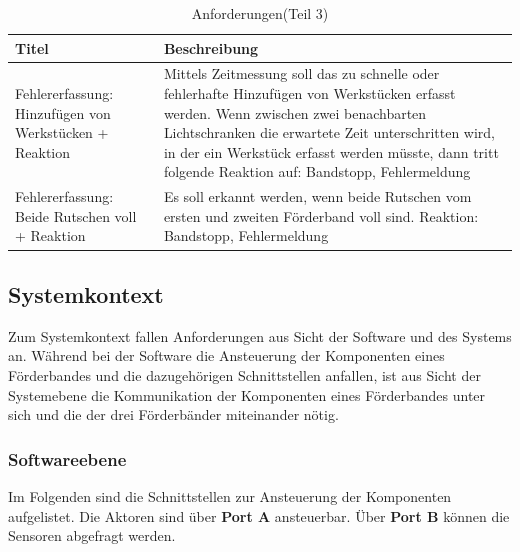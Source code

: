 \documentclass[a4paper, 11pt]{article}
\begin{document}
\newpage

\begin{table}[H]
\centering
    \begin{tabularx}{\textwidth}{|X|X|}
    \hline
    \textbf{Titel}&\textbf{Beschreibung}\\
    \hline
    Fehlererfassung: Hinzufügen von Werkstücken + Reaktion&Mittels Zeitmessung soll das zu schnelle oder fehlerhafte Hinzufügen von Werkstücken erfasst werden. Wenn zwischen zwei benachbarten Lichtschranken die erwartete Zeit unterschritten wird, in der ein Werkstück erfasst werden müsste, dann tritt folgende Reaktion auf: Bandstopp, Fehlermeldung \\
    \hline
    Fehlererfassung: Beide Rutschen voll + Reaktion&Es soll erkannt werden, wenn beide Rutschen vom ersten und zweiten Förderband voll sind. Reaktion: Bandstopp, Fehlermeldung \\
    \hline
    \end{tabularx}
    \caption{Anforderungen(Teil 3)}
    \label{anf3}
\end{table}

\newpage
\subsection{Systemkontext}
Zum Systemkontext fallen Anforderungen aus Sicht der Software und des Systems an. Während bei der Software die Ansteuerung der Komponenten eines Förderbandes und die dazugehörigen Schnittstellen anfallen, ist aus Sicht der Systemebene die Kommunikation der Komponenten eines Förderbandes unter sich und die der drei Förderbänder miteinander nötig. 

\subsubsection{Softwareebene}
Im Folgenden sind die Schnittstellen zur Ansteuerung der Komponenten aufgelistet. Die Aktoren sind über \textbf{Port A} ansteuerbar. Über \textbf{Port B} können die Sensoren abgefragt werden.\\
\end{document}
